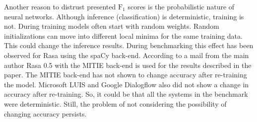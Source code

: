 Another reason to distrust presented $\text{F}_1$ scores is the probabilistic nature of neural networks.
Although inference (classification) is deterministic, training is not.
During training models often start with random weights.
Random initializations can move into different local minima for the same training data.
This could change the inference results.
During benchmarking this effect has been observed for Rasa using the spaCy back-end.
According to a mail from the main author Rasa 0.5 with the MITIE back-end is used for the results described in the paper.
The MITIE back-end has not shown to change accuracy after re-training the model.
Microsoft LUIS and Google Dialogflow also did not show a change in accuracy after re-training.
So, it could be that all the systems in the benchmark were deterministic.
Still, the problem of not considering the possibility of changing accuracy persists.

